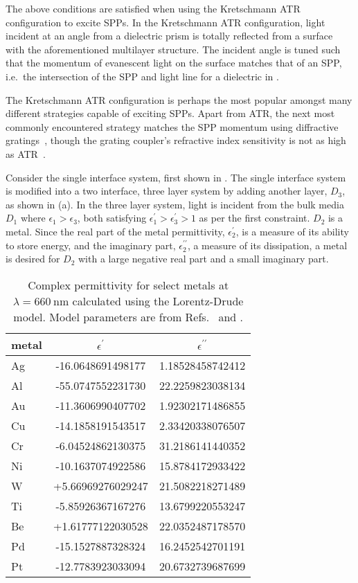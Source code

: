 The above conditions are satisfied when using the Kretschmann ATR
configuration to excite SPPs.  In the Kretschmann ATR configuration, light
incident at an angle from a dielectric prism is totally reflected from a
surface with the aforementioned multilayer structure.  The incident angle
is tuned such that the momentum of evanescent light on the surface matches
that of an SPP, i.e.\ the intersection of the SPP and light line
for a dielectric in .  

The Kretschmann ATR configuration is perhaps the most popular amongst many
different strategies capable of exciting SPPs.  Apart from ATR, the next
most commonly encountered strategy matches the SPP momentum using
diffractive gratings~\cite{homola1999surface}, though the grating coupler's
refractive index sensitivity is not as high as
ATR~\cite{homola1999senscomparison}.

Consider the single interface system, first shown in
.  The single interface system is modified
into a two interface, three layer system by adding another layer, $D_3$, as
shown in (a).  In the three layer system,
light is incident from the bulk media $D_1$ where $\epsilon_1>\epsilon_3$,
both satisfying $\epsilon^\prime_1>\epsilon^\prime_3>1$ as per the first
constraint.  $D_2$ is a metal.  Since the real part of the metal
permittivity, $\epsilon_2^\prime$, is a measure of its ability to store
energy, and the imaginary part, $\epsilon_2^{\prime\prime}$, a measure of
its dissipation, a metal is desired for $D_2$ with a large negative real
part and a small imaginary part.  
\begin{table}[ht]
\centering
{}
\begin{tabular}{lSS}
\toprule
metal & {$\epsilon^\prime$} & {$\epsilon^{\prime\prime}$} \\
\midrule
Ag & -16.0648691498177 & 1.18528458742412\\
Al & -55.0747552231730 & 22.2259823038134\\
Au & -11.3606990407702 & 1.92302171486855\\
Cu & -14.1858191543517 & 2.33420338076507\\
Cr & -6.04524862130375 & 31.2186141440352\\
Ni & -10.1637074922586 & 15.8784172933422\\
W  & +5.66969276029247 & 21.5082218271489\\
Ti & -5.85926367167276 & 13.6799220553247\\
Be & +1.61777122030528 & 22.0352487178570\\
Pd & -15.1527887328324 & 16.2452542701191\\
Pt & -12.7783923033094 & 20.6732739687699\\
\bottomrule
\end{tabular}
\caption{Complex permittivity for select metals at
$\lambda=\SI{660}{\nano\meter}$ calculated using the Lorentz-Drude
model.  Model parameters are from Refs.~\cite{ung2007interference} and
\cite{rakic1998optical}.}
\label{tbl:epsmetal600}
\end{table}

